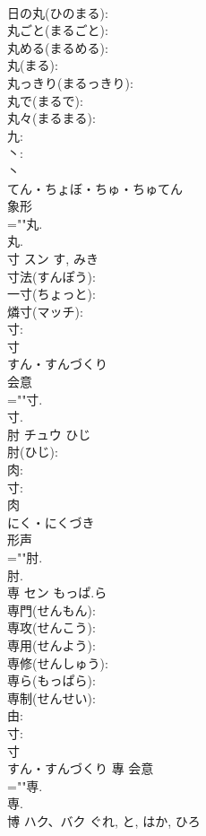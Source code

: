 \documentclass[8pt]{extreport}
\begin{document}
\begin{CJK}{UTF8}{min}
\\	日の丸(ひのまる): 
\\	丸ごと(まるごと): 
\\	丸める(まるめる): 
\\	丸(まる): 
\\	丸っきり(まるっきり): 
\\	丸で(まるで): 
\\	丸々(まるまる): 
\\	九: 
\\	丶: 
\\	丶	
\\	てん・ちょぼ・ちゅ・ちゅてん	
\\	象形 
\\	=""丸.
\\	丸.
\\	寸	スン		す, みき	
\\	寸法(すんぽう): 
\\	一寸(ちょっと): 
\\	燐寸(マッチ): 
\\	寸: 
\\	寸	
\\	すん・すんづくり	
\\	会意 
\\	=""寸.
\\	寸.
\\	肘	チュウ	ひじ		
\\	肘(ひじ): 
\\	肉: 
\\	寸: 
\\	肉	
\\	にく・にくづき	
\\	形声 
\\	=""肘.
\\	肘.
\\	専	セン	もっぱ.ら		
\\	専門(せんもん): 
\\	専攻(せんこう): 
\\	専用(せんよう): 
\\	専修(せんしゅう): 
\\	専ら(もっぱら): 
\\	専制(せんせい): 
\\	由: 
\\	寸: 
\\	寸	
\\	すん・すんづくり	專	会意 
\\	=""専.
\\	専.
\\	博	ハク、バク		ぐれ, と, はか, ひろ	

\end{CJK}
\end{document}
